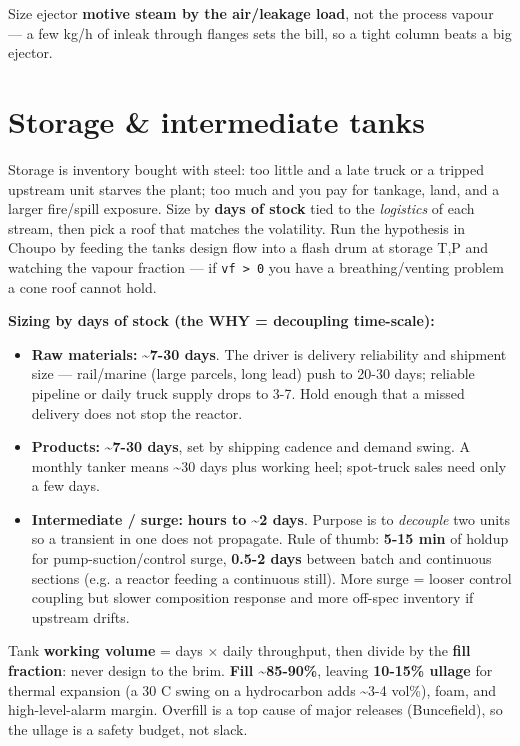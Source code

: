\documentclass[11pt,a4paper]{article}
\providecommand{\tightlist}{\setlength{\itemsep}{0pt}\setlength{\parskip}{0pt}}
\begin{document}
Size ejector \textbf{motive steam by the air/leakage load}, not the
process vapour --- a few kg/h of inleak through flanges sets the bill,
so a tight column beats a big ejector.

\hypertarget{storage--intermediate-tanks}{%
\section{Storage \& intermediate
tanks}\label{storage--intermediate-tanks}}

Storage is inventory bought with steel: too little and a late truck or a
tripped upstream unit starves the plant; too much and you pay for
tankage, land, and a larger fire/spill exposure. Size by \textbf{days of
stock} tied to the \emph{logistics} of each stream, then pick a roof
that matches the volatility. Run the hypothesis in Choupo by feeding the
tank\textquotesingle s design flow into a flash drum at storage T,P and
watching the vapour fraction --- if \texttt{vf\ \textgreater{}\ 0} you
have a breathing/venting problem a cone roof cannot hold.

\textbf{Sizing by days of stock (the WHY = decoupling time-scale):}

\begin{itemize}
\tightlist
\item
  \textbf{Raw materials:} \textasciitilde{}\textbf{7-30 days}. The
  driver is delivery reliability and shipment size --- rail/marine
  (large parcels, long lead) push to 20-30 days; reliable pipeline or
  daily truck supply drops to 3-7. Hold enough that a missed delivery
  does not stop the reactor.
\item
  \textbf{Products:} \textasciitilde{}\textbf{7-30 days}, set by
  shipping cadence and demand swing. A monthly tanker means
  \textasciitilde30 days plus working heel; spot-truck sales need only a
  few days.
\item
  \textbf{Intermediate / surge:} \textbf{hours to \textasciitilde2
  days}. Purpose is to \emph{decouple} two units so a transient in one
  does not propagate. Rule of thumb: \textbf{5-15 min} of holdup for
  pump-suction/control surge, \textbf{0.5-2 days} between batch and
  continuous sections (e.g. a reactor feeding a continuous still). More
  surge = looser control coupling but slower composition response and
  more off-spec inventory if upstream drifts.
\end{itemize}

Tank \textbf{working volume} = days \(\times\) daily throughput, then divide by
the \textbf{fill fraction}: never design to the brim. \textbf{Fill
\textasciitilde85-90\%}, leaving \textbf{10-15\% ullage} for thermal
expansion (a 30 \textdegree{}C swing on a hydrocarbon adds \textasciitilde3-4
vol\%), foam, and high-level-alarm margin. Overfill is a top cause of
major releases (Buncefield), so the ullage is a safety budget, not
slack.
\end{document}
